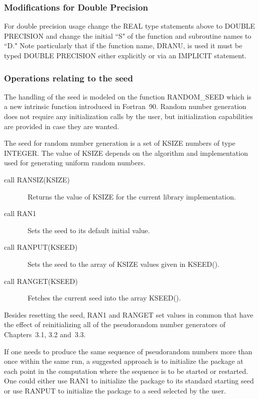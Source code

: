 \documentclass[twoside]{MATH77}
\begin{document}
\subsubsection{Modifications for Double Precision}

For double precision usage change the REAL type statements above to DOUBLE
PRECISION and change the initial ``S" of the function and subroutine names
to ``D." Note particularly that if the function name, DRANU, is used it must
be typed DOUBLE PRECISION either explicitly or via an IMPLICIT statement.

\subsubsection{Operations relating to the seed}

The handling of the seed is modeled on the function RANDOM\_SEED which is a
new intrinsic function introduced in Fortran~90. Random number generation
does not require any initialization calls by the user, but initialization
capabilities are provided in case they are wanted.

The seed for random number generation is a set of KSIZE numbers of type
INTEGER. The value of KSIZE depends on the algorithm and implementation used
for generating uniform random numbers.
\begin{description}
\item[call RANSIZ(KSIZE)] \ Returns the value of KSIZE for the current library
implementation.

\item[call RAN1] \ Sets the seed to its default initial value.

\item[call RANPUT(KSEED)] \ Sets the seed to the array of KSIZE values given in
KSEED().

\item[call RANGET(KSEED)] \ Fetches the current seed into the array KSEED().
\end{description}

Besides resetting the seed, RAN1 and RANGET set values in common that have
the effect of reinitializing all of the pseudorandom number generators of
Chapters~3.1, 3.2 and~3.3.

If one needs to produce the same sequence of pseudorandom numbers more than
once within the same run, a suggested approach is to initialize the package
at each point in the computation where the sequence is to be started or
restarted. One could either use RAN1 to initialize the package to its
standard starting seed or use RANPUT to initialize the package to a seed
selected by the user.
\end{document}
